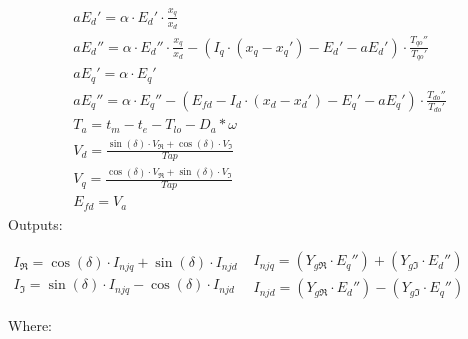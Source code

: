 \documentclass[letterpaper]{article}
\begin{document}
\begin{equation*}
\begin{gathered}aE_{d}'=\alpha \cdot {E_{d}'}\cdot
{\frac{x_{q}}{x_{d}}}\\aE_{d}''=\alpha \cdot {E_{d}''}\cdot
{\frac{x_{q}}{x_{d}}}-(I_{q}\cdot (x_{q}-x_{q}')-E_{d}'-aE_{d}')\cdot
{\frac{T_{\mathit{qo}}''}{T_{\mathit{qo}}'}}\\aE_{q}'=\alpha \cdot
{E_{q}'}\\aE_{q}''=\alpha \cdot {E_{q}''}-(E_{\mathit{fd}}-I_{d}\cdot
(x_{d}-x_{d}')-E_{q}'-aE_{q}')\cdot
{\frac{T_{\mathit{do}}''}{T_{\mathit{do}}'}}\\T_{a}=t_{m}-t_{e}-T_{\mathit{lo}}-D_{a}\ast
\omega \\V_{d}=\frac{\sin (\delta )\cdot V_{\Re }+\cos (\delta )\cdot
V_{\Im }}{\mathit{Tap}}\\V_{q}=\frac{\cos (\delta )\cdot V_{\Re }+\sin
(\delta )\cdot V_{\Im
}}{\mathit{Tap}}\\E_{\mathit{fd}}=V_{a}\end{gathered}
\end{equation*}
Outputs:

 $\begin{gathered}I_{\Re }=\cos (\delta )\cdot I_{\mathit{njq}}+\sin
(\delta )\cdot I_{\mathit{njd}}\\I_{\Im }=\sin (\delta )\cdot
I_{\mathit{njq}}-\cos (\delta )\cdot I_{\mathit{njd}}\end{gathered}$
$\begin{gathered}I_{\mathit{njq}}=(Y_{g\Re }\cdot E_{q}'')+(Y_{g\Im
}\cdot E_{d}'')\\I_{\mathit{njd}}=(Y_{g\Re }\cdot E_{d}'')-(Y_{g\Im
}\cdot E_{q}'')\end{gathered}$

Where:
\end{document}
